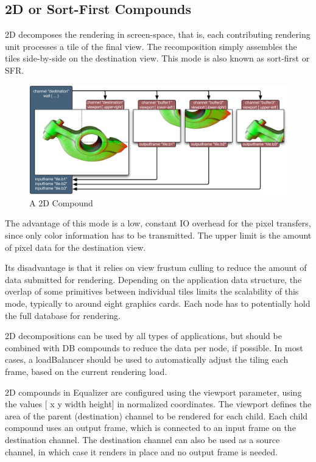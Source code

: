 \documentclass[10pt,a4]{scrartcl}
\begin{document}
\subsection{2D or Sort-First Compounds}

2D decomposes the rendering in screen-space, that is, each contributing
rendering unit processes a tile of the final view. The recomposition
simply assembles the tiles side-by-side on the destination view. This
mode is also known as sort-first or SFR.

\begin{figure}
  \includegraphics[width=.618\textwidth]{images/2D.pdf}
  {\caption{ A 2D Compound}}
\end{figure}
The advantage of this mode is a low, constant IO overhead for the pixel
transfers, since only color information has to be transmitted. The upper
limit is the amount of pixel data for the destination view.

Its disadvantage is that it relies on view frustum culling to reduce the
amount of data submitted for rendering. Depending on the application
data structure, the overlap of some primitives between individual tiles
limits the scalability of this mode, typically to around eight graphics
cards. Each node has to potentially hold the full database for
rendering.

2D decompositions can be used by all types of applications, but should
be combined with DB compounds to reduce the data per node, if
possible. In most cases, a \textsf{loadBalancer} should be used to
automatically adjust the tiling each frame, based on the current
rendering load.

2D compounds in Equalizer are configured using the \textsf{viewport}
parameter, using the values \textsf{[ x y width height]} in normalized
coordinates. The viewport defines the area of the parent (destination)
channel to be rendered for each child. Each child compound uses an
output frame, which is connected to an input frame on the destination
channel. The destination channel can also be used as a source channel,
in which case it renders in place and no output frame is needed.
\end{document}
